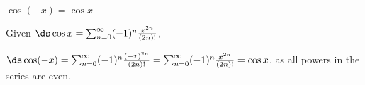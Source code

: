 {$\cos(-x) = \cos x$
}
{Given $\ds \cos x = \sum_{n=0}^\infty (-1)^n\frac{x^{2n}}{(2n)!}$,

$\ds\cos (-x) = \sum_{n=0}^\infty (-1)^n\frac{(-x)^{2n}}{(2n)!}=\sum_{n=0}^\infty (-1)^n\frac{x^{2n}}{(2n)!}=\cos x$, as all powers in the series are even.
}